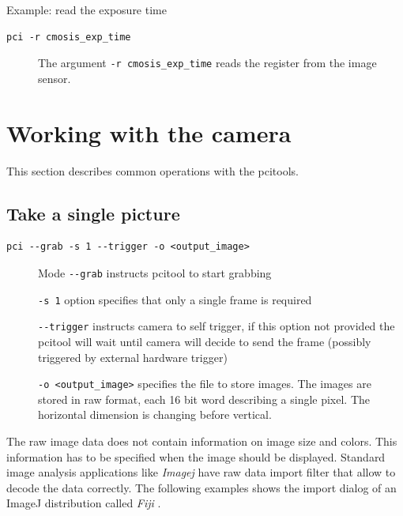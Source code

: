 

Example: read the exposure time

\begin{verbatim}
pci -r cmosis_exp_time
\end{verbatim}

\begin{description}
\item[] The argument  \verb/-r cmosis_exp_time/ reads the register from the image sensor. 
\end{description}




\section{Working with the camera}

This section describes common operations with the pcitools. 


\subsection{Take a single picture}

\begin{verbatim}
pci --grab -s 1 --trigger -o <output_image>
\end{verbatim}

\begin{description}
\item[ ] Mode \verb/--grab/ instructs pcitool to start grabbing
\item[ ] \verb/-s 1/ option specifies that only a single frame is required
\item[ ] \verb/--trigger/ instructs camera to self trigger, if this option not provided the pcitool will wait
until camera will decide to send the frame (possibly triggered by external hardware trigger)
\item[ ] \verb/-o <output_image>/ specifies the file to store images. The images are stored in raw format, each 16 bit word describing a single pixel. The horizontal dimension is changing before vertical.
\end{description}

The raw image data does not contain information on image size and colors. This information has to be specified when the image should be displayed. Standard image analysis applications like \emph{Imagej} \cite{SW:IMAGEJ} have raw data import filter that allow to decode the data correctly. 
The following examples shows the import dialog of an ImageJ distribution called \emph{Fiji} \cite{SW:FIJI}. 

